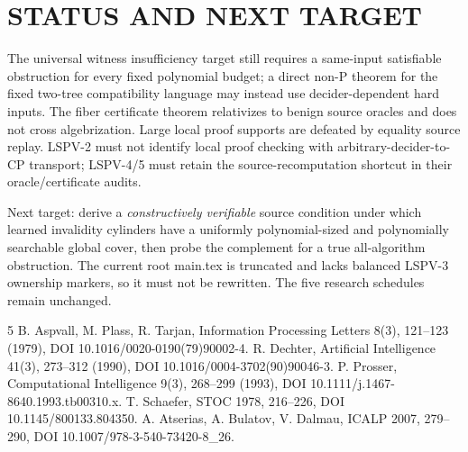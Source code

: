 \documentclass[11pt]{article}
\begin{document}
\section{STATUS AND NEXT TARGET}
The universal witness insufficiency target still requires a same-input satisfiable obstruction for every fixed polynomial budget; a direct non-P theorem for the fixed two-tree compatibility language may instead use decider-dependent hard inputs. The fiber certificate theorem relativizes to benign source oracles and does not cross algebrization. Large local proof supports are defeated by equality source replay. LSPV-2 must not identify local proof checking with arbitrary-decider-to-CP transport; LSPV-4/5 must retain the source-recomputation shortcut in their oracle/certificate audits.

Next target: derive a \emph{constructively verifiable} source condition under which learned invalidity cylinders have a uniformly polynomial-sized and polynomially searchable global cover, then probe the complement for a true all-algorithm obstruction. The current root main.tex is truncated and lacks balanced LSPV-3 ownership markers, so it must not be rewritten. The five research schedules remain unchanged.

\begin{thebibliography}{5}
 B. Aspvall, M. Plass, R. Tarjan, Information Processing Letters 8(3), 121--123 (1979), DOI 10.1016/0020-0190(79)90002-4.
 R. Dechter, Artificial Intelligence 41(3), 273--312 (1990), DOI 10.1016/0004-3702(90)90046-3.
 P. Prosser, Computational Intelligence 9(3), 268--299 (1993), DOI 10.1111/j.1467-8640.1993.tb00310.x.
 T. Schaefer, STOC 1978, 216--226, DOI 10.1145/800133.804350.
 A. Atserias, A. Bulatov, V. Dalmau, ICALP 2007, 279--290, DOI 10.1007/978-3-540-73420-8_26.
\end{thebibliography}
\end{document}
